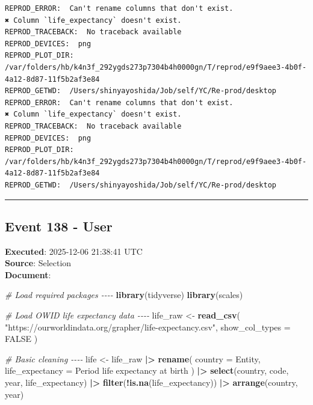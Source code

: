 \documentclass[
  11pt,
]{article}
\newenvironment{Shaded}{\begin{snugshade}}{\end{snugshade}}
\newcommand{\AttributeTok}[1]{\textcolor[rgb]{0.13,0.29,0.53}{#1}}
\newcommand{\CommentTok}[1]{\textcolor[rgb]{0.56,0.35,0.01}{\textit{#1}}}
\newcommand{\ConstantTok}[1]{\textcolor[rgb]{0.56,0.35,0.01}{#1}}
\newcommand{\FunctionTok}[1]{\textcolor[rgb]{0.13,0.29,0.53}{\textbf{#1}}}
\newcommand{\NormalTok}[1]{#1}
\newcommand{\OtherTok}[1]{\textcolor[rgb]{0.56,0.35,0.01}{#1}}
\newcommand{\SpecialCharTok}[1]{\textcolor[rgb]{0.81,0.36,0.00}{\textbf{#1}}}
\newcommand{\StringTok}[1]{\textcolor[rgb]{0.31,0.60,0.02}{#1}}
\newenvironment{rpoutput}{\vspace{0.5em}\begin{snugshade}}{\end{snugshade}}
\begin{document}
\begin{rpoutput}

\begin{verbatim}
REPROD_ERROR:  Can't rename columns that don't exist.
✖ Column `life_expectancy` doesn't exist. 
REPROD_TRACEBACK:  No traceback available  
REPROD_DEVICES:  png 
REPROD_PLOT_DIR:  /var/folders/hb/k4n3f_292ygds273p7304b4h0000gn/T/reprod/e9f9aee3-4b0f-4a12-8d87-11f5b2af3e84 
REPROD_GETWD:  /Users/shinyayoshida/Job/self/YC/Re-prod/desktop 
REPROD_ERROR:  Can't rename columns that don't exist.
✖ Column `life_expectancy` doesn't exist. 
REPROD_TRACEBACK:  No traceback available  
REPROD_DEVICES:  png 
REPROD_PLOT_DIR:  /var/folders/hb/k4n3f_292ygds273p7304b4h0000gn/T/reprod/e9f9aee3-4b0f-4a12-8d87-11f5b2af3e84 
REPROD_GETWD:  /Users/shinyayoshida/Job/self/YC/Re-prod/desktop 
\end{verbatim}

\end{rpoutput}

\begin{center}\rule{0.5\linewidth}{0.5pt}\end{center}

\subsection{Event 138 - User}\label{event-138---user}

\textbf{Executed}: 2025-12-06 21:38:41 UTC\\
\textbf{Source}: Selection\\
\textbf{Document}:

\begin{Shaded}
\begin{Highlighting}[]
\CommentTok{\# Load required packages {-}{-}{-}{-}}
\FunctionTok{library}\NormalTok{(tidyverse)}
\FunctionTok{library}\NormalTok{(scales)}

\CommentTok{\# Load OWID life expectancy data {-}{-}{-}{-}}
\NormalTok{life\_raw }\OtherTok{\textless{}{-}} \FunctionTok{read\_csv}\NormalTok{(}
  \StringTok{"https://ourworldindata.org/grapher/life{-}expectancy.csv"}\NormalTok{,}
  \AttributeTok{show\_col\_types =} \ConstantTok{FALSE}
\NormalTok{)}

\CommentTok{\# Basic cleaning {-}{-}{-}{-}}
\NormalTok{life }\OtherTok{\textless{}{-}}\NormalTok{ life\_raw }\SpecialCharTok{|\textgreater{}}
  \FunctionTok{rename}\NormalTok{(}
    \AttributeTok{country =}\NormalTok{ Entity,}
    \AttributeTok{life\_expectancy =} \StringTok{\textasciigrave{}}\AttributeTok{Period life expectancy at birth}\StringTok{\textasciigrave{}}
\NormalTok{  ) }\SpecialCharTok{|\textgreater{}}
  \FunctionTok{select}\NormalTok{(country, code, year, life\_expectancy) }\SpecialCharTok{|\textgreater{}}
  \FunctionTok{filter}\NormalTok{(}\SpecialCharTok{!}\FunctionTok{is.na}\NormalTok{(life\_expectancy)) }\SpecialCharTok{|\textgreater{}}
  \FunctionTok{arrange}\NormalTok{(country, year)}
\end{Highlighting}
\end{Shaded}
\end{document}
